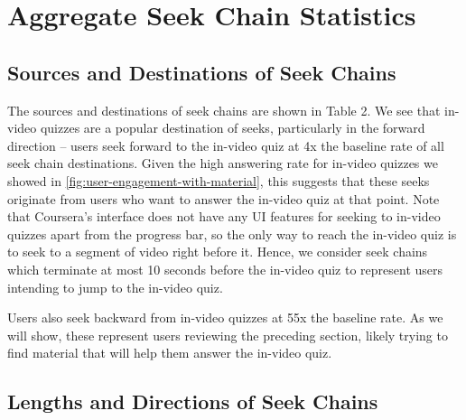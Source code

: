 \documentclass{sigchi}
\begin{document}
\section{Aggregate Seek Chain Statistics}

\subsection{Sources and Destinations of Seek Chains}

The sources and destinations of seek chains are shown in Table 2. We see that in-video quizzes are a popular destination of seeks, particularly in the forward direction -- users seek forward to the in-video quiz at 4x the baseline rate of all seek chain destinations. Given the high answering rate for in-video quizzes we showed in \autoref{fig:user-engagement-with-material}, this suggests that these seeks originate from users who want to answer the in-video quiz at that point. Note that Coursera's interface does not have any UI features for seeking to in-video quizzes apart from the progress bar, so the only way to reach the in-video quiz is to seek to a segment of video right before it. Hence, we consider seek chains which terminate at most 10 seconds before the in-video quiz to represent users intending to jump to the in-video quiz.

Users also seek backward from in-video quizzes at 55x the baseline rate. As we will show, these represent users reviewing the preceding section, likely trying to find material that will help them answer the in-video quiz. %





\subsection{Lengths and Directions of Seek Chains}
\end{document}
